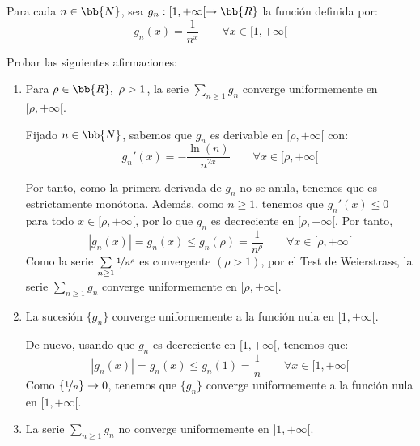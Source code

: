 \begin{ejercicio}
    Para cada $n\in \bb{N}$, sea $g_n:[1, +\infty[ \to\bb{R}$ la función definida por:
    \begin{equation*}
        g_n(x) = \frac{1}{n^x} \qquad \forall x\in[1, +\infty[
    \end{equation*}

    Probar las siguientes afirmaciones:
    \begin{enumerate}
        \item Para $\rho \in \bb{R},~\rho > 1$, la serie $\sum\limits_{n\geq 1}g_n$ converge uniformemente en $[\rho, +\infty[$.
        
        Fijado $n\in \bb{N}$, sabemos que $g_n$ es derivable en $[\rho, +\infty[$ con:
        \begin{equation*}
            g_n'(x) = -\frac{\ln(n)}{n^{2x}} \qquad \forall x\in[\rho, +\infty[
        \end{equation*}

        Por tanto, como la primera derivada de $g_n$ no se anula, tenemos que es estrictamente monótona. Además,
        como $n\geq 1$, tenemos que $g_n'(x) \leq 0$ para todo $x\in[\rho, +\infty[$, por lo que $g_n$ es decreciente en $[\rho, +\infty[$. Por tanto,
        \begin{equation*}
            |g_n(x)| = g_n(x) \leq g_n(\rho) = \frac{1}{n^\rho} \qquad \forall x\in[\rho, +\infty[
        \end{equation*}
        Como la serie $\sum\limits_{n\geq 1}\nicefrac{1}{n^\rho}$ es convergente $\left(\rho > 1\right)$, por el Test de Weierstrass, la serie $\sum\limits_{n\geq 1}g_n$ converge uniformemente en $[\rho, +\infty[$.
        
        \item La sucesión $\{g_n\}$ converge uniformemente a la función nula en $[1, +\infty[$.
        
        De nuevo, usando que $g_n$ es decreciente en $[1, +\infty[$, tenemos que:
        \begin{equation*}
            |g_n(x)| = g_n(x) \leq g_n(1) = \frac{1}{n} \qquad \forall x\in[1, +\infty[
        \end{equation*}
        Como $\left\{\nicefrac{1}{n}\right\}\to 0$, tenemos que $\{g_n\}$ converge uniformemente a la función nula en $[1, +\infty[$.

        \item La serie $\sum\limits_{n\geq 1}g_n$ no converge uniformemente en $]1, +\infty[$.
        

\end{enumerate}
\end{ejercicio}
